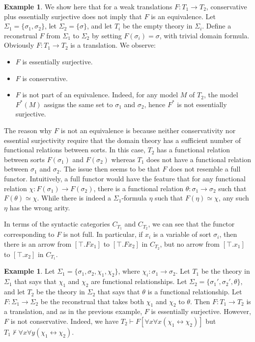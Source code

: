 \documentclass[12pt]{article}
\theoremstyle{definition}
\newtheorem{example}[prop]{Example}
\theoremstyle{remark}
\newcommand{\3}{\mathcal}
\begin{document}
\begin{example} \label{nope} We show here that for a weak translations
  $F:T_1\to T_2$, conservative plus essentially surjective does not
  imply that $F$ is an equivalence. Let
  $\Sigma _1 = \{ \sigma _1,\sigma _2\}$, let
  $\Sigma _2= \{ \sigma \}$, and let $T_i$ be the empty theory in
  $\Sigma _i$. Define a reconstrual $F$ from $\Sigma _1$ to
  $\Sigma _2$ by setting $F(\sigma _i)=\sigma$, with trivial domain
  formula. Obviously $F:T_1\to T_2$ is a translation. We observe:
  \begin{itemize}
  \item $F$ is essentially surjective.
  \item $F$ is conservative.  
  \item $F$ is not part of an equivalence. Indeed, for any model $M$
    of $T_2$, the model $F^*(M)$ assigns the same set to $\sigma _1$
    and $\sigma _2$, hence $F^*$ is not essentially surjective.
  \end{itemize}
  The reason why $F$ is not an equivalence is because neither
  conservativity nor essential surjectivity require that the domain
  theory has a sufficient number of functional relations between
  sorts. In this case, $T_2$ has a functional relation between sorts
  $F(\sigma _1)$ and $F(\sigma _2)$ whereas $T_1$ does not have a
  functional relation between $\sigma _1$ and $\sigma _2$.  The issue
  then seems to be that $F$ does not resemble a full
  functor. Intuitively, a full functor would have the feature that for
  any functional relation $\chi :F(\sigma _1)\to F(\sigma _2)$, there
  is a functional relation $\theta :\sigma _1\to \sigma _2$ such that
  $F(\theta )\simeq \chi$. While there is indeed a $\Sigma _1$-formula
  $\eta$ such that $F(\eta )\simeq \chi$, any such $\eta$ has the
  wrong arity.

  In terms of the syntactic categories $C_{T_1}$ and $C_{T_2}$, we can
  see that the functor corresponding to $F$ is not full. In
  particular, if $x_i$ is a variable of sort $\sigma _i$, then there
  is an arrow from $[\top .Fx_1]$ to $[\top .Fx_2]$ in $C_{T_2}$, but
  no arrow from $[\top .x_1]$ to $[\top .x_2]$ in
  $C_{T_1}$.  \end{example}

\begin{example} Let
  $\Sigma _1 = \{ \sigma _1,\sigma _2,\chi _1,\chi _2\}$, where
  $\chi _i:\sigma _1\to \sigma _2$. Let $T_1$ be the theory in
  $\Sigma _1$ that says that $\chi _1$ and $\chi _2$ are functional
  relationships. Let $\Sigma _2 =\{ \sigma _1',\sigma _2',\theta \}$,
  and let $T_2$ be the theory in $\Sigma _2$ that says that $\theta$
  is a functional relationship. Let $F:\Sigma _1\to \Sigma _2$ be the
  reconstrual that takes both $\chi _1$ and $\chi _2$ to
  $\theta$. Then $F:T_1\to T_2$ is a translation, and as in the
  previous example, $F$ is essentially surjective. However, $F$ is not
  conservative. Indeed, we have
  $T_2\vdash F[\forall x\forall x(\chi _1\leftrightarrow \chi _2)]$
  but
  $T_1\not\vdash \forall x\forall y(\chi _1\leftrightarrow \chi _2)$.
\end{example}
\end{document}

